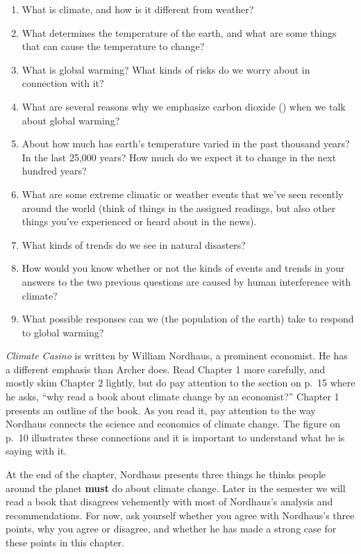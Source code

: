 \documentclass[
]{article}
\providecommand{\tightlist}{%
  \setlength{\itemsep}{0pt}\setlength{\parskip}{0pt}}
\newcommand{\COO}{\ce{CO2}}
\begin{document}
\begin{enumerate}
\def\labelenumi{\arabic{enumi}.}
\tightlist
\item
  What is climate, and how is it different from weather?
\item
  What determines the temperature of the earth, and what are some things
  that can cause the temperature to change?
\item
  What is global warming? What kinds of risks do we worry about in
  connection with it?
\item
  What are several reasons why we emphasize carbon dioxide (\COO{}) when
  we talk about global warming?
\item
  About how much has earth's temperature varied in the past thousand
  years? In the last 25,000 years? How much do we expect it to change in
  the next hundred years?
\item
  What are some extreme climatic or weather events that we've seen
  recently around the world (think of things in the assigned readings,
  but also other things you've experienced or heard about in the news).
\item
  What kinds of trends do we see in natural disasters?
\item
  How would you know whether or not the kinds of events and trends in
  your answers to the two previous questions are caused by human
  interference with climate?
\item
  What possible responses can we (the population of the earth) take to
  respond to global warming?
\end{enumerate}

\emph{Climate Casino} is written by William Nordhaus, a prominent
economist. He has a different emphasis than Archer does. Read Chapter 1
more carefully, and mostly skim Chapter 2 lightly, but do pay attention
to the section on p.~15 where he asks, ``why read a book about climate
change by an economist?'' Chapter 1 presents an outline of the book. As
you read it, pay attention to the way Nordhaus connects the science and
economics of climate change. The figure on p.~10 illustrates these
connections and it is important to understand what he is saying with it.

At the end of the chapter, Nordhaus presents three things he thinks
people around the planet \textbf{must} do about climate change. Later in
the semester we will read a book that disagrees vehemently with most of
Nordhaus's analysis and recommendations. For now, ask yourself whether
you agree with Nordhaus's three points, why you agree or disagree, and
whether he has made a strong case for these points in this chapter.
\end{document}
